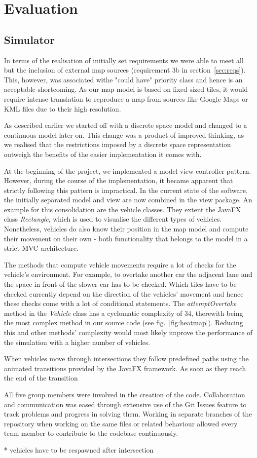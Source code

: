 \section{Evaluation}
\subsection{Simulator}\label{ss:eval_sim}
In terms of the realisation of initially set requirements we were able to meet all but the inclusion of external map sources (requirement 3b in section~\ref{sec:reqs}). This, however, was associated withe "could have" priority class and hence is an acceptable shortcoming. As our map model is based on fixed sized tiles, it would require intense translation to reproduce a map from sources like Google Maps or KML files due to their high resolution. 

As described earlier we started off with a discrete space model and changed to a continuous model later on. This change was a product of improved thinking, as we realised that the restrictions imposed by a discrete space representation outweigh the benefits of the easier implementation it comes with.

At the beginning of the project, we implemented a model-view-controller pattern. However, during the course of the implementation, it became apparent that strictly following this pattern is impractical. In the current state of the software, the initially separated model and view are now combined in the view package. An example for this consolidation are the vehicle classes. They extent the JavaFX class \textit{Rectangle}, which is used to visualise the different types of vehicles. Nonetheless, vehicles do also know their position in the map model and compute their movement on their own - both functionality that belongs to the model in a strict MVC architecture.

The methods that compute vehicle movements require a lot of checks for the vehicle's environment. For example, to overtake another car the adjacent lane and the space in front of the slower car has to be checked. Which tiles have to be checked currently depend on the direction of the vehicles' movement and hence these checks come with a lot of conditional statements. The \textit{attemptOvertake} method in the \textit{Vehicle} class has a cyclomatic complexity of 34, therewith being the most complex method in our source code (see fig.~\ref{fig:heatmap}). Reducing this and other methods' complexity would most likely improve the performance of the simulation with a higher number of vehicles. 

When vehicles move through intersections they follow predefined paths using the animated transitions provided by the JavaFX framework. As soon as they reach the end of the transition 

All five group members were involved in the creation of the code. Collaboration and communication was eased through extensive use of the Git Issues feature to track problems and progress in solving them. Working in separate branches of the repository when working on the same files or related behaviour allowed every team member to contribute to the codebase continuously.  

\bigskip
* vehicles have to be respawned after intersection
